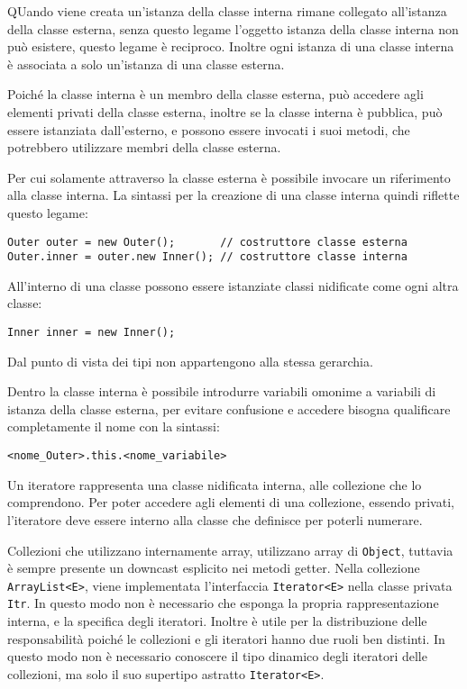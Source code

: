 \documentclass{article}
\numberwithin{equation}{subsection}
\begin{document}
QUando viene creata un'istanza della classe interna rimane collegato all'istanza della classe esterna, senza questo legame l'oggetto istanza della classe interna non può 
esistere, questo legame è reciproco. 
Inoltre ogni istanza di una classe interna è associata a solo un'istanza di una classe esterna.  

Poiché la classe interna è un membro della classe esterna, può accedere agli elementi privati della classe esterna, inoltre se la classe interna è pubblica, può essere istanziata 
dall'esterno, e possono essere invocati i suoi metodi, che potrebbero utilizzare membri della classe esterna. 

Per cui solamente attraverso la classe esterna è possibile invocare un riferimento alla classe interna. 
La sintassi per la creazione di una classe interna quindi riflette questo legame:
\begin{verbatim}
Outer outer = new Outer();       // costruttore classe esterna
Outer.inner = outer.new Inner(); // costruttore classe interna 
\end{verbatim}
All'interno di una classe possono essere istanziate classi nidificate come ogni altra classe:
\begin{verbatim}
Inner inner = new Inner();    
\end{verbatim}

Dal punto di vista dei tipi non appartengono alla stessa gerarchia. 

Dentro la classe interna è possibile introdurre variabili omonime a variabili di istanza della classe esterna, per evitare confusione e accedere bisogna qualificare 
completamente il nome con la sintassi:
\begin{verbatim}
<nome_Outer>.this.<nome_variabile>
\end{verbatim}

Un iteratore rappresenta una classe nidificata interna, alle collezione che lo comprendono. Per poter accedere agli elementi di una collezione, essendo privati, 
l'iteratore deve essere interno alla classe che definisce per poterli numerare. 

Collezioni che utilizzano internamente array, utilizzano array di \verb|Object|, tuttavia è sempre presente un downcast esplicito nei metodi getter. 
Nella collezione \verb|ArrayList<E>|, viene implementata l'interfaccia \verb|Iterator<E>| nella classe privata \verb|Itr|. In questo modo non è necessario che esponga la 
propria rappresentazione interna, e la specifica degli iteratori. Inoltre è utile per la distribuzione delle responsabilità poiché le collezioni e gli iteratori hanno 
due ruoli ben distinti. In questo modo non è necessario conoscere il tipo dinamico degli iteratori delle collezioni, ma solo il suo supertipo astratto \verb|Iterator<E>|. 
\end{document}
